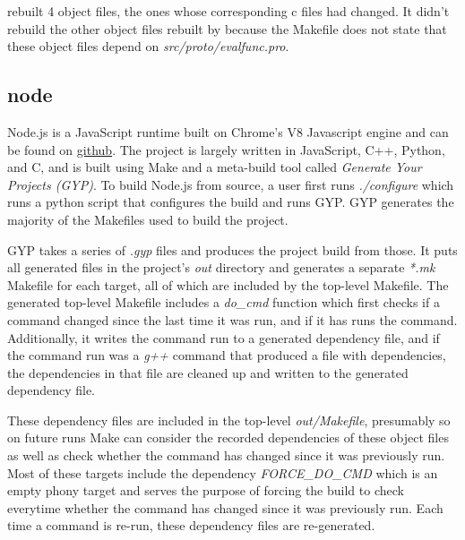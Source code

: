 \Make rebuilt 4 object files, the ones whose corresponding c files had changed.  It didn't rebuild the other object files rebuilt by \Rattle because the Makefile does not state that these object files
depend on \emph{src/proto/evalfunc.pro}.


\subsection{node}
\label{sec:eval:node}

Node.js is a JavaScript runtime built on Chrome's V8 Javascript engine and can be found on \href{``https://github.com/nodejs/node''}{github}.  The project is largely written in JavaScript, C++, Python, and C, and is built using Make and a meta-build tool called \emph{Generate Your Projects (GYP)}.  To build Node.js from source, a user first runs \emph{./configure} which runs a python script that configures the build and runs GYP.  GYP generates the majority of the Makefiles used to build the project.

GYP takes a series of \emph{.gyp} files and produces the project build from those.  It puts all generated files in the project's \emph{out} directory and generates a separate \emph{*.mk} Makefile for each target, all of which are included by the top-level Makefile.  The generated top-level Makefile includes a \emph{do\_cmd} function which first checks if a command changed since the last time it was run, and if it has runs the command.  Additionally, it writes the command run to a generated dependency file, and if the command run was a \emph{g++} command that produced a file with dependencies, the dependencies in that file are cleaned up and written to the generated dependency file.

These dependency files are included in the top-level \emph{out/Makefile}, presumably so on future runs Make can consider the recorded dependencies of these object files as well as check whether the command has changed since it was previously run.  Most of these targets include the dependency \emph{FORCE\_DO\_CMD} which is an empty phony target and serves the purpose of forcing the build to check everytime whether the command has changed since it was previously run. Each time a command is re-run, these dependency files are re-generated.


